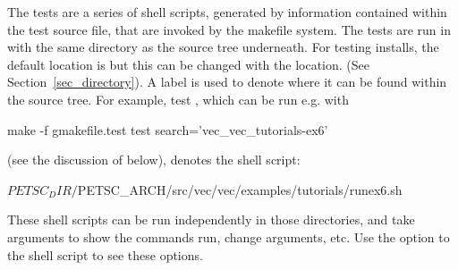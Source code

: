 The tests are a series of shell scripts, generated by information
contained within the test source file, that are invoked by the makefile
system.  The tests are run in 
with the same directory as the source tree underneath.
For testing installs, the default location is
 but this can be changed with the  location.
(See Section~\ref{sec_directory}).  
A label is used to denote where it can be found within the source tree.
For example, test ,
which can be run e.g. with
\begin{bashlisting}
make -f gmakefile.test test search='vec_vec_tutorials-ex6'
\end{bashlisting}
(see the discussion of  below), denotes the shell
script:
\begin{bashlisting}
${PETSC_DIR}/${PETSC_ARCH}/src/vec/vec/examples/tutorials/runex6.sh
\end{bashlisting}
These shell scripts can be run independently in those directories, and
take arguments to show the commands run, change arguments, etc.  Use the
 option to the shell script to see these options.

